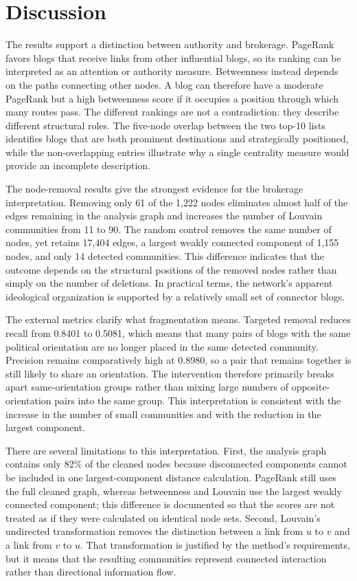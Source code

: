 \documentclass[conference]{IEEEtran}
\begin{document}
\section{Discussion}
The results support a distinction between authority and brokerage. PageRank favors blogs that receive links from other influential blogs, so its ranking can be interpreted as an attention or authority measure. Betweenness instead depends on the paths connecting other nodes. A blog can therefore have a moderate PageRank but a high betweenness score if it occupies a position through which many routes pass. The different rankings are not a contradiction: they describe different structural roles. The five-node overlap between the two top-10 lists identifies blogs that are both prominent destinations and strategically positioned, while the non-overlapping entries illustrate why a single centrality measure would provide an incomplete description.

The node-removal results give the strongest evidence for the brokerage interpretation. Removing only 61 of the 1,222 nodes eliminates almost half of the edges remaining in the analysis graph and increases the number of Louvain communities from 11 to 90. The random control removes the same number of nodes, yet retains 17,404 edges, a largest weakly connected component of 1,155 nodes, and only 14 detected communities. This difference indicates that the outcome depends on the structural positions of the removed nodes rather than simply on the number of deletions. In practical terms, the network's apparent ideological organization is supported by a relatively small set of connector blogs.

The external metrics clarify what fragmentation means. Targeted removal reduces recall from 0.8401 to 0.5081, which means that many pairs of blogs with the same political orientation are no longer placed in the same detected community. Precision remains comparatively high at 0.8980, so a pair that remains together is still likely to share an orientation. The intervention therefore primarily breaks apart same-orientation groups rather than mixing large numbers of opposite-orientation pairs into the same group. This interpretation is consistent with the increase in the number of small communities and with the reduction in the largest component.

There are several limitations to this interpretation. First, the analysis graph contains only 82\% of the cleaned nodes because disconnected components cannot be included in one largest-component distance calculation. PageRank still uses the full cleaned graph, whereas betweenness and Louvain use the largest weakly connected component; this difference is documented so that the scores are not treated as if they were calculated on identical node sets. Second, Louvain's undirected transformation removes the distinction between a link from $u$ to $v$ and a link from $v$ to $u$. That transformation is justified by the method's requirements, but it means that the resulting communities represent connected interaction rather than directional information flow.
\end{document}
